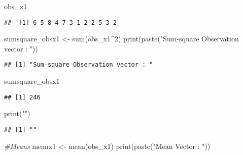 \documentclass[
]{article}
\newenvironment{Shaded}{\begin{snugshade}}{\end{snugshade}}
\newcommand{\CommentTok}[1]{\textcolor[rgb]{0.56,0.35,0.01}{\textit{#1}}}
\newcommand{\DecValTok}[1]{\textcolor[rgb]{0.00,0.00,0.81}{#1}}
\newcommand{\FunctionTok}[1]{\textcolor[rgb]{0.00,0.00,0.00}{#1}}
\newcommand{\NormalTok}[1]{#1}
\newcommand{\OtherTok}[1]{\textcolor[rgb]{0.56,0.35,0.01}{#1}}
\newcommand{\SpecialCharTok}[1]{\textcolor[rgb]{0.00,0.00,0.00}{#1}}
\newcommand{\StringTok}[1]{\textcolor[rgb]{0.31,0.60,0.02}{#1}}
\begin{document}
\begin{Shaded}
\begin{Highlighting}[]
\NormalTok{obs\_x1}
\end{Highlighting}
\end{Shaded}

\begin{verbatim}
##  [1] 6 5 8 4 7 3 1 2 2 5 3 2
\end{verbatim}

\begin{Shaded}
\begin{Highlighting}[]
\NormalTok{sumsquare\_obsx1 }\OtherTok{\textless{}{-}} \FunctionTok{sum}\NormalTok{(obs\_x1}\SpecialCharTok{\^{}}\DecValTok{2}\NormalTok{)}
\FunctionTok{print}\NormalTok{(}\FunctionTok{paste}\NormalTok{(}\StringTok{"Sum{-}square Observation vector : "}\NormalTok{))}
\end{Highlighting}
\end{Shaded}

\begin{verbatim}
## [1] "Sum-square Observation vector : "
\end{verbatim}

\begin{Shaded}
\begin{Highlighting}[]
\NormalTok{sumsquare\_obsx1}
\end{Highlighting}
\end{Shaded}

\begin{verbatim}
## [1] 246
\end{verbatim}

\begin{Shaded}
\begin{Highlighting}[]
\FunctionTok{print}\NormalTok{(}\StringTok{""}\NormalTok{)}
\end{Highlighting}
\end{Shaded}

\begin{verbatim}
## [1] ""
\end{verbatim}

\begin{Shaded}
\begin{Highlighting}[]
\CommentTok{\#Means}
\NormalTok{meanx1 }\OtherTok{\textless{}{-}} \FunctionTok{mean}\NormalTok{(obs\_x1)}
\FunctionTok{print}\NormalTok{(}\FunctionTok{paste}\NormalTok{(}\StringTok{"Mean Vector : "}\NormalTok{))}
\end{Highlighting}
\end{Shaded}
\end{document}
